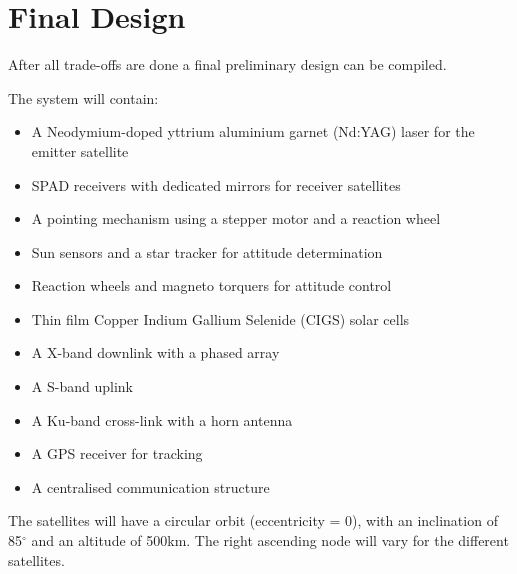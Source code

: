 \section{Final Design}
After all trade-offs are done a final preliminary design can be compiled. 

The system will contain:
\begin{itemize}
\item {A Neodymium-doped yttrium aluminium garnet (Nd:YAG) laser for the emitter satellite}
\item {\ac{SPAD} receivers with dedicated mirrors for receiver satellites}
\item {A pointing mechanism using a stepper motor and a reaction wheel}
\item {Sun sensors and a star tracker for attitude determination}
\item {Reaction wheels and magneto torquers for attitude control}
\item {Thin film Copper Indium Gallium Selenide (CIGS) solar cells}
\item {A X-band downlink with a phased array}
\item {A S-band uplink}
\item {A Ku-band cross-link with a horn antenna}
\item {A \ac{GPS} receiver for tracking}
\item {A centralised communication structure}
\end{itemize}

The satellites will have a circular orbit (eccentricity = 0), with an inclination of 85${}^\circ$ and an altitude of 500km. The right ascending node will vary for the different satellites.
